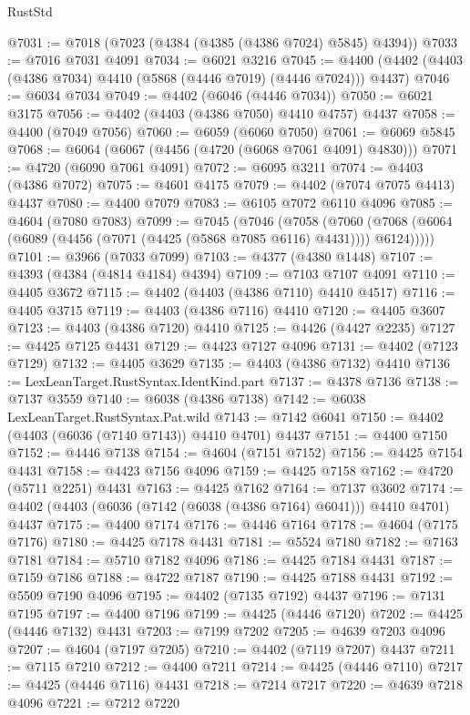 \begin{lexlean}{RustStd}
\begin{coremodule}
@7031 := @7018 (@7023 (@4384 (@4385 (@4386 @7024) @5845) @4394))
@7033 := @7016 @7031 @4091
@7034 := @6021 @3216
@7045 := @4400 (@4402 (@4403 (@4386 @7034) @4410 (@5868 (@4446 @7019) (@4446 @7024))) @4437)
@7046 := @6034 @7034
@7049 := @4402 (@6046 (@4446 @7034))
@7050 := @6021 @3175
@7056 := @4402 (@4403 (@4386 @7050) @4410 @4757) @4437
@7058 := @4400 (@7049 @7056)
@7060 := @6059 (@6060 @7050)
@7061 := @6069 @5845
@7068 := @6064 (@6067 (@4456 (@4720 (@6068 @7061 @4091) @4830)))
@7071 := @4720 (@6090 @7061 @4091)
@7072 := @6095 @3211
@7074 := @4403 (@4386 @7072)
@7075 := @4601 @4175
@7079 := @4402 (@7074 @7075 @4413) @4437
@7080 := @4400 @7079
@7083 := @6105 @7072 @6110 @4096
@7085 := @4604 (@7080 @7083)
@7099 := @7045
    (@7046
      (@7058
        (@7060 (@7068 (@6064 (@6089 (@4456 (@7071 (@4425 (@5868 @7085 @6116) @4431)))) @6124)))))
@7101 := @3966 (@7033 @7099)
@7103 := @4377 (@4380 @1448)
@7107 := @4393 (@4384 (@4814 @4184) @4394)
@7109 := @7103 @7107 @4091
@7110 := @4405 @3672
@7115 := @4402 (@4403 (@4386 @7110) @4410 @4517)
@7116 := @4405 @3715
@7119 := @4403 (@4386 @7116) @4410
@7120 := @4405 @3607
@7123 := @4403 (@4386 @7120) @4410
@7125 := @4426 (@4427 @2235)
@7127 := @4425 @7125 @4431
@7129 := @4423 @7127 @4096
@7131 := @4402 (@7123 @7129)
@7132 := @4405 @3629
@7135 := @4403 (@4386 @7132) @4410
@7136 := LexLeanTarget.RustSyntax.IdentKind.part
@7137 := @4378 @7136
@7138 := @7137 @3559
@7140 := @6038 (@4386 @7138)
@7142 := @6038 LexLeanTarget.RustSyntax.Pat.wild
@7143 := @7142 @6041
@7150 := @4402 (@4403 (@6036 (@7140 @7143)) @4410 @4701) @4437
@7151 := @4400 @7150
@7152 := @4446 @7138
@7154 := @4604 (@7151 @7152)
@7156 := @4425 @7154 @4431
@7158 := @4423 @7156 @4096
@7159 := @4425 @7158
@7162 := @4720 (@5711 @2251) @4431
@7163 := @4425 @7162
@7164 := @7137 @3602
@7174 := @4402 (@4403 (@6036 (@7142 (@6038 (@4386 @7164) @6041))) @4410 @4701) @4437
@7175 := @4400 @7174
@7176 := @4446 @7164
@7178 := @4604 (@7175 @7176)
@7180 := @4425 @7178 @4431
@7181 := @5524 @7180
@7182 := @7163 @7181
@7184 := @5710 @7182 @4096
@7186 := @4425 @7184 @4431
@7187 := @7159 @7186
@7188 := @4722 @7187
@7190 := @4425 @7188 @4431
@7192 := @5509 @7190 @4096
@7195 := @4402 (@7135 @7192) @4437
@7196 := @7131 @7195
@7197 := @4400 @7196
@7199 := @4425 (@4446 @7120)
@7202 := @4425 (@4446 @7132) @4431
@7203 := @7199 @7202
@7205 := @4639 @7203 @4096
@7207 := @4604 (@7197 @7205)
@7210 := @4402 (@7119 @7207) @4437
@7211 := @7115 @7210
@7212 := @4400 @7211
@7214 := @4425 (@4446 @7110)
@7217 := @4425 (@4446 @7116) @4431
@7218 := @7214 @7217
@7220 := @4639 @7218 @4096
@7221 := @7212 @7220

\end{coremodule}
\end{lexlean}
